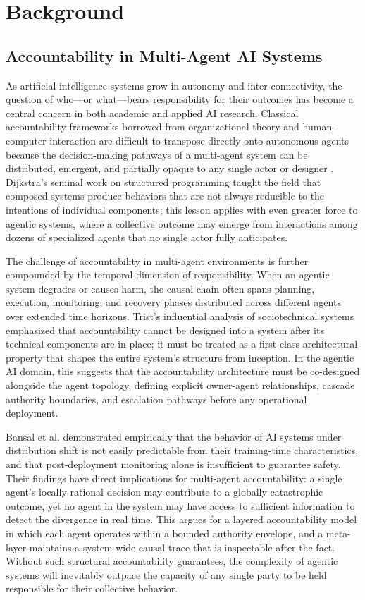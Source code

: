 \section{Background}

\subsection{Accountability in Multi-Agent AI Systems}

As artificial intelligence systems grow in autonomy and inter-connectivity, the question of who---or what---bears responsibility for their outcomes has become a central concern in both academic and applied AI research. Classical accountability frameworks borrowed from organizational theory and human-computer interaction are difficult to transpose directly onto autonomous agents because the decision-making pathways of a multi-agent system can be distributed, emergent, and partially opaque to any single actor or designer \cite{dijkstra1982}. Dijkstra's seminal work on structured programming taught the field that composed systems produce behaviors that are not always reducible to the intentions of individual components; this lesson applies with even greater force to agentic systems, where a collective outcome may emerge from interactions among dozens of specialized agents that no single actor fully anticipates.

The challenge of accountability in multi-agent environments is further compounded by the temporal dimension of responsibility. When an agentic system degrades or causes harm, the causal chain often spans planning, execution, monitoring, and recovery phases distributed across different agents over extended time horizons. Trist's influential analysis of sociotechnical systems \cite{tristr81} emphasized that accountability cannot be designed into a system after its technical components are in place; it must be treated as a first-class architectural property that shapes the entire system's structure from inception. In the agentic AI domain, this suggests that the accountability architecture must be co-designed alongside the agent topology, defining explicit owner-agent relationships, cascade authority boundaries, and escalation pathways before any operational deployment.

Bansal et al. \cite{bansal2019} demonstrated empirically that the behavior of AI systems under distribution shift is not easily predictable from their training-time characteristics, and that post-deployment monitoring alone is insufficient to guarantee safety. Their findings have direct implications for multi-agent accountability: a single agent's locally rational decision may contribute to a globally catastrophic outcome, yet no agent in the system may have access to sufficient information to detect the divergence in real time. This argues for a layered accountability model in which each agent operates within a bounded authority envelope, and a meta-layer maintains a system-wide causal trace that is inspectable after the fact. Without such structural accountability guarantees, the complexity of agentic systems will inevitably outpace the capacity of any single party to be held responsible for their collective behavior.

